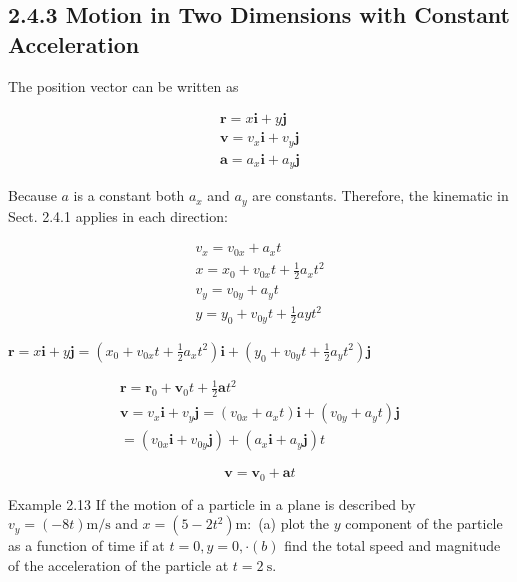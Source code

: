 \documentclass[10pt]{article}
\begin{document}
\subsection*{2.4.3 Motion in Two Dimensions with Constant Acceleration}
The position vector can be written as

$$
\begin{gathered}
\mathbf{r}=x \mathbf{i}+y \mathbf{j} \\
\mathbf{v}=v_{x} \mathbf{i}+v_{y} \mathbf{j} \\
\mathbf{a}=a_{x} \mathbf{i}+a_{y} \mathbf{j}
\end{gathered}
$$

Because $a$ is a constant both $a_{x}$ and $a_{y}$ are constants. Therefore, the kinematic in Sect. 2.4.1 applies in each direction:


\begin{gather*}
v_{x}=v_{0 x}+a_{x} t  \tag{2.8}\\
x=x_{0}+v_{0 x} t+\frac{1}{2} a_{x} t^{2}  \tag{2.9}\\
v_{y}=v_{0 y}+a_{y} t  \tag{2.10}\\
y=y_{0}+v_{0 y} t+\frac{1}{2} a y t^{2} \tag{2.11}
\end{gather*}


$\mathbf{r}=x \mathbf{i}+y \mathbf{j}=\left(x_{0}+v_{0 x} t+\frac{1}{2} a_{x} t^{2}\right) \mathbf{i}+\left(y_{0}+v_{0 y} t+\frac{1}{2} a_{y} t^{2}\right) \mathbf{j}$


\begin{gather*}
\mathbf{r}=\mathbf{r}_{0}+\mathbf{v}_{0} t+\frac{1}{2} \mathbf{a} t^{2}  \tag{2.12}\\
\mathbf{v}=v_{x} \mathbf{i}+v_{y} \mathbf{j}=\left(v_{0 x}+a_{x} t\right) \mathbf{i}+\left(v_{0 y}+a_{y} t\right) \mathbf{j} \\
=\left(v_{0 x} \mathbf{i}+v_{0 y} \mathbf{j}\right)+\left(a_{x} \mathbf{i}+a_{y} \mathbf{j}\right) t
\end{gather*}



\begin{equation*}
\mathbf{v}=\mathbf{v}_{0}+\mathbf{a} t \tag{2.13}
\end{equation*}


Example 2.13 If the motion of a particle in a plane is described by $v_{y}=(-8 t) \mathrm{m} / \mathrm{s}$ and $x=\left(5-2 t^{2}\right) \mathrm{m}:$ (a) plot the $y$ component of the particle as a function of time if at $t=0, y=0, \cdot(b)$ find the total speed and magnitude of the acceleration of the particle at $t=2 \mathrm{~s}$.
\end{document}
